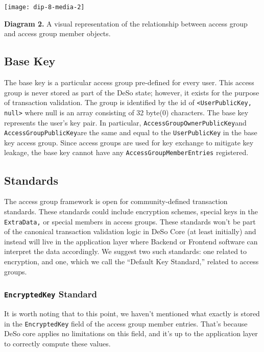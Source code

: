 \documentclass[oneside, 12pt]{article}
\begin{document}
\texttt{[image: dip-8-media-2]}
\begin{center}
    \begin{footnotesize}
    \textbf{Diagram 2.} A visual representation of the relationship between access group and access group member objects.
    \end{footnotesize}
\end{center}

\subsection{Base Key}
The base key is a particular access group pre-defined for every user. This access group is never stored as part of the DeSo state; however, it exists for the purpose of transaction validation. The group is identified by the id of \texttt{<UserPublicKey, null>} where null is an array consisting of 32 byte(0) characters. The base key represents the user’s key pair. In particular, \texttt{AccessGroupOwnerPublicKey}and \texttt{AccessGroupPublicKey}are the same and equal to the \texttt{UserPublicKey} in the base key access group. Since access groups are used for key exchange to mitigate key leakage, the base key cannot have any \texttt{AccessGroupMemberEntries} registered.

\subsection{Standards}
The access group framework is open for community-defined transaction standards. These standards could include encryption schemes, special keys in the \texttt{ExtraData,} or special members in access groups. These standards won’t be part of the canonical transaction validation logic in DeSo Core (at least initially) and instead will live in the application layer where Backend or Frontend software can interpret the data accordingly. We suggest two such standards: one related to encryption, and one, which we call the “Default Key Standard,” related to access groups.

\subsubsection{\texttt{EncryptedKey} Standard}
It is worth noting that to this point, we haven’t mentioned what exactly is stored in the \texttt{EncryptedKey} field of the access group member entries. That’s because DeSo core applies no limitations on this field, and it’s up to the application layer to correctly compute these values.
\end{document}
